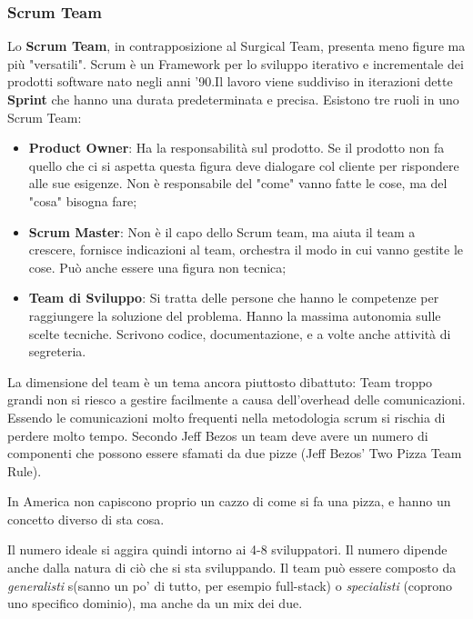 \subsubsection{Scrum Team}
Lo \textbf{Scrum Team}, in contrapposizione al Surgical Team, presenta meno figure ma più "versatili". Scrum è un Framework per lo sviluppo iterativo e incrementale dei prodotti software nato negli anni '90.\newline Il lavoro viene suddiviso in iterazioni dette \textbf{Sprint} che hanno una durata predeterminata e precisa. Esistono tre ruoli in uno Scrum Team:
\begin{itemize}
	\item \textbf{Product Owner}: Ha la responsabilità sul prodotto. Se il prodotto non fa quello che ci si aspetta questa figura deve dialogare col cliente per rispondere alle sue esigenze. Non è responsabile del "come" vanno fatte le cose, ma del "cosa" bisogna fare;
	\item \textbf{Scrum Master}: Non è il capo dello Scrum team, ma aiuta il team a crescere, fornisce indicazioni al team, orchestra il modo in cui vanno gestite le cose. Può anche essere una figura non tecnica;
	\item \textbf{Team di Sviluppo}: Si tratta delle persone che hanno le competenze per raggiungere la soluzione del problema. Hanno la massima autonomia sulle scelte tecniche. Scrivono codice, documentazione, e a volte anche attività di segreteria.
\end{itemize}
La dimensione del team è un tema ancora piuttosto dibattuto:
Team troppo grandi non si riesco a gestire facilmente a causa dell'overhead delle comunicazioni. Essendo le comunicazioni molto frequenti nella metodologia scrum si rischia di perdere molto tempo.
Secondo Jeff Bezos un team deve avere un numero di componenti che possono essere sfamati da due pizze (Jeff Bezos' Two Pizza Team Rule).
\begin{warn}
	In America non capiscono proprio un cazzo di come si fa una pizza, e hanno un concetto diverso di sta cosa.
\end{warn}
Il numero ideale si aggira quindi intorno ai 4-8 sviluppatori. Il numero dipende anche dalla natura di ciò che si sta sviluppando. Il team può essere composto da \textit{generalisti} s(sanno un po' di tutto, per esempio full-stack) o \textit{specialisti} (coprono uno specifico dominio), ma anche da un mix dei due.\newline
